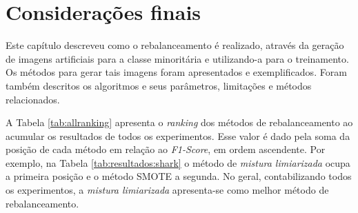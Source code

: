 \section{Considerações finais}

Este capítulo descreveu como o rebalanceamento é realizado, através da geração de imagens artificiais para a classe minoritária e utilizando-a para o treinamento. Os métodos para gerar tais imagens foram apresentados e exemplificados. Foram também descritos os algoritmos e seus parâmetros, limitações e métodos relacionados.

A Tabela \ref{tab:allranking} apresenta o \textit{ranking} dos métodos de rebalanceamento ao acumular os resultados de todos os experimentos. Esse valor é dado pela soma da posição de cada método em relação ao \textit{F1-Score}, em ordem ascendente. Por exemplo, na Tabela \ref{tab:resultados:shark} o método de \textit{mistura limiarizada} ocupa a primeira posição e o método SMOTE a segunda. No geral, contabilizando todos os experimentos, a \textit{mistura limiarizada} apresenta-se como melhor método de rebalanceamento.


